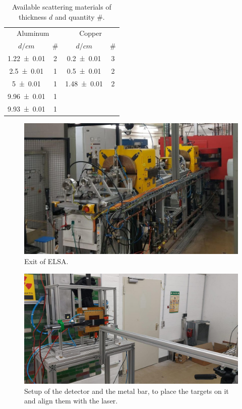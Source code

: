 \documentclass[sn-mathphys-num,iicol]{sn-jnl}
\theoremstyle{thmstyleone}
\theoremstyle{thmstyletwo}
\theoremstyle{thmstylethree}
\begin{document}
\begin{table}\centering
  \renewcommand*{\arraystretch}{1.1}
  \begin{tabular}{c|c||c|c}
    \multicolumn{2}{c||}{Aluminum} & \multicolumn{2}{c}{Copper} \\
    {\fontsize{8}{3}\selectfont $d/\si{cm}$} & {\fontsize{8}{3}\selectfont \#} & {\fontsize{8}{3}\selectfont $d/\si{cm}$} & {\fontsize{8}{3}\selectfont \# } \\\hline \rule{0pt}{3ex}
    \num{1.22\pm 0.01} & 2 & \num{0.2\pm 0.01} & 3 \\
    \num{2.5\pm 0.01} & 1 & \num{0.5\pm 0.01} & 2 \\
    \num{5\pm 0.01} & 1 & \num{1.48\pm 0.01} & 2 \\
    \num{9.96\pm 0.01} & 1 & & \\
    \num{9.93\pm 0.01} & 1 & & \\
  \end{tabular}\vspace{3mm}
  \caption{Available scattering materials of thickness $d$ and quantity $\#$.}
  \label{tab:available_materials}
\end{table}

\begin{figure}
  \includegraphics[width=\linewidth]{figures/beam_setup_elsa.jpg}
  \caption{Exit of ELSA.}
  \label{fig:beam_setup_elsa}
\end{figure}

\begin{figure}
  \includegraphics[width=\linewidth]{figures/detector_setup_elsa.jpg}
  \caption{Setup of the detector and the metal bar, to place the targets on it and align them with the laser.}
  \label{fig:detector_setup_elsa}
\end{figure}
\end{document}
